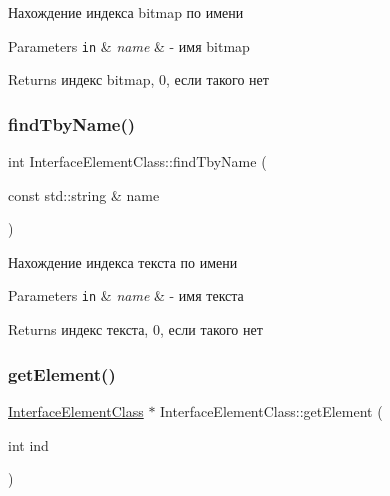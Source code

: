 Нахождение индекса bitmap по имени 


\begin{DoxyParams}[1]{Parameters}
\mbox{\tt in}  & {\em name} & -\/ имя bitmap \\
\hline
\end{DoxyParams}
\begin{DoxyReturn}{Returns}
индекс bitmap, 0, если такого нет 
\end{DoxyReturn}
\mbox{\label{class_interface_element_class_a2d7805e3c6f80068b76618e3ad43f31f}} 
\subsubsection{\texorpdfstring{find\+Tby\+Name()}{findTbyName()}}
{\footnotesize\ttfamily int Interface\+Element\+Class\+::find\+Tby\+Name (\begin{DoxyParamCaption}\item[{const std\+::string \&}]{name }\end{DoxyParamCaption})}



Нахождение индекса текста по имени 


\begin{DoxyParams}[1]{Parameters}
\mbox{\tt in}  & {\em name} & -\/ имя текста \\
\hline
\end{DoxyParams}
\begin{DoxyReturn}{Returns}
индекс текста, 0, если такого нет 
\end{DoxyReturn}
\mbox{\label{class_interface_element_class_aee5a321eaf772ef561bab59b51fb36b9}} 
\subsubsection{\texorpdfstring{get\+Element()}{getElement()}}
{\footnotesize\ttfamily \hyperlink{class_interface_element_class}{Interface\+Element\+Class} $\ast$ Interface\+Element\+Class\+::get\+Element (\begin{DoxyParamCaption}\item[{int}]{ind }\end{DoxyParamCaption})\hspace{0.3cm}{\ttfamily [virtual]}}



